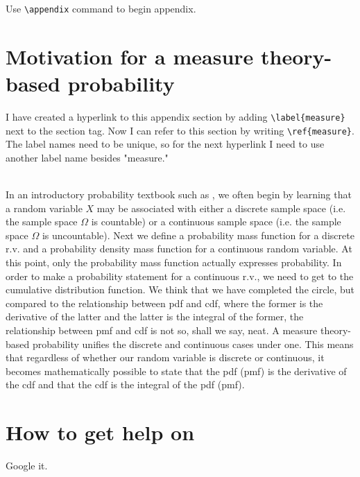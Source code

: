 \documentclass[12pt, notitlepage]{article}
\begin{document}
\newpage 
\appendix 

\begin{notes}
Use \verb|\appendix| command to begin appendix. 
\end{notes}


\section{Motivation for a measure theory-based probability} \label{measure}

\begin{notes}
I have created a hyperlink to this appendix section by adding \verb|\label{measure}| next to the section tag. Now I can refer to this section by writing \verb|\ref{measure}|. The label names need to be unique, so for the next hyperlink I need to use another label name besides "measure."
\end{notes}
\\

In an introductory probability textbook such as \cite{ross}, we often begin by learning that a random variable $X$ may be associated with either a discrete sample space (i.e. the sample space $\Omega$ is countable) or a continuous sample space (i.e. the sample space $\Omega$ is uncountable). Next we define a probability mass function for a discrete r.v. and a probability density mass function for a continuous random variable. At this point, only the probability mass function actually expresses probability. In order to make a probability statement for a continuous r.v., we need to get to the cumulative distribution function. We think that we have completed the circle, but compared to the relationship between pdf and cdf, where the former is the derivative of the latter and the latter is the integral of the former, the relationship between pmf and cdf is not so, shall we say, neat. A measure theory-based probability unifies the discrete and continuous cases under one. This means that regardless of whether our random variable is discrete or continuous, it becomes mathematically possible to state that the pdf (pmf) is the derivative of the cdf and that the cdf is the integral of the pdf (pmf). 


\section{How to get help on \latex}

{\LARGE Google it.} \\
\end{document}
